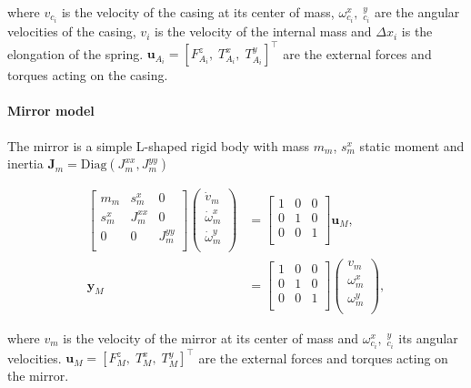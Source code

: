 where $v_{c_i}$ is the velocity of the casing at its center of mass, $\omega_{c_i}^x, \; _{c_i}^y$ are the angular velocities of the casing, $v_i$ is the velocity of the internal mass and $\Delta x_i$ is the elongation of the spring. $\bm{u}_{A_i} = [F_{A_i}^z, \;  T_{A_i}^x, \;  T_{A_i}^y]^\top$ are the external forces and torques acting on the casing.

\paragraph{Mirror model} The mirror is a simple L-shaped rigid body with mass $m_m$, $s_m^x$ static moment and inertia $\mathbf{J}_m = \mathrm{Diag}({J}_{m}^{xx}, {J}_{m}^{yy})$

\begin{equation}
\begin{aligned}
\begin{bmatrix}
m_{m} & s_m^x & 0\\
s_m^x & {J}_{m}^{xx} & 0 \\
0 & 0 & {J}_{m}^{yy} \\
\end{bmatrix}
\begin{pmatrix}
\dot{v}_{m} \\
\dot{\omega}_{m}^x \\
\dot{\omega}_{m}^y \\
\end{pmatrix} &= 
\begin{bmatrix}
1 & 0 & 0 \\
0 & 1 & 0 \\
0 & 0 & 1 \\
\end{bmatrix}\mathbf{u}_M, \\
\mathbf{y}_M &= \begin{bmatrix}
1 & 0 & 0 \\
0 & 1 & 0 \\
0 & 0 & 1 \\
\end{bmatrix}
\begin{pmatrix}
{v}_{m} \\
{\omega}_{m}^x \\
{\omega}_{m}^y \\
\end{pmatrix},
\end{aligned}
\end{equation}

where $v_{m}$ is the velocity of the mirror at its center of mass and $\omega_{c_i}^x, \; _{c_i}^y$ its angular velocities. $\mathbf{u}_M = [F_{M}^z, \;  T_{M}^x, \;  T_{M}^y]^\top$ are the external forces and torques acting on the mirror.

